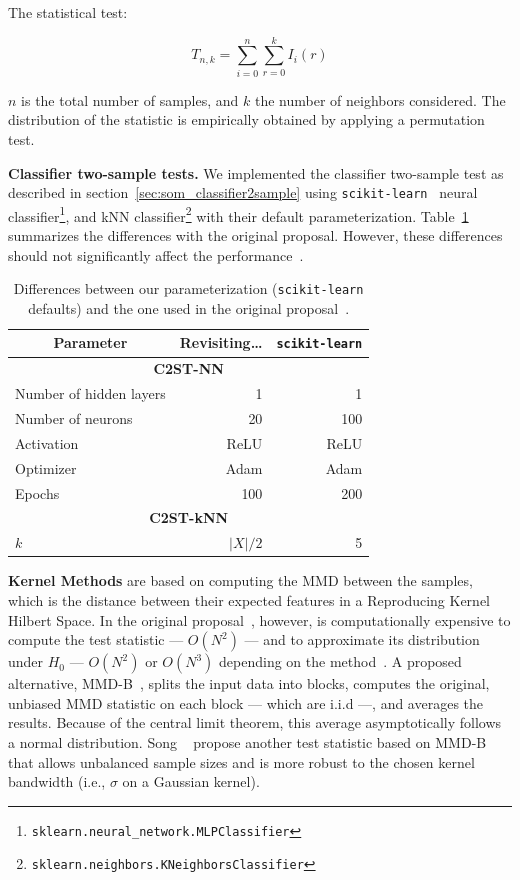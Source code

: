 The statistical test:

\begin{equation}
    T_{n,k} = \sum_{i=0}^{n}\sum_{r=0}^{k} I_i(r)
\end{equation}

$n$ is the total number of samples, and $k$ the number of neighbors considered.
The distribution of the statistic is empirically obtained by applying a permutation test.
 
\textbf{Classifier two-sample tests.}
We implemented the classifier two-sample test as described in section~\ref{sec:som_classifier2sample}
using \texttt{scikit-learn}~\cite{scikit-learn} neural
classifier\footnote{\texttt{sklearn.neural\_network.MLPClassifier}},
and \gls{kNN} classifier\footnote{\texttt{sklearn.neighbors.KNeighborsClassifier}}
with their default parameterization. Table~\ref{tab:classifier_diff} summarizes the differences with the original proposal. However, these differences should not significantly affect the performance~\cite{lopez2016revisiting}.

\begin{table}[htpb]
\centering
\begin{tabular}{lrr}
\multicolumn{1}{c}{\bfseries Parameter}       & \bfseries Revisiting\ldots & \texttt{scikit-learn}     \\ \hline
\multicolumn{3}{c}{\bfseries C2ST-NN} \\
Number of hidden layers &  1     &   1    \\
Number of neurons       & 20     & 100    \\
Activation              & ReLU   & ReLU   \\
Optimizer               & Adam   & Adam   \\
Epochs                  & 100    & 200    \\
\multicolumn{3}{c}{\bfseries C2ST-kNN} \\
$k$                     & $|X|/2$ & 5 \\
\end{tabular}
\caption[Differences between our parameterization]{
    Differences between our parameterization (\texttt{scikit-learn} defaults) and the one
    used in the original proposal~\cite{lopez2016revisiting}.
}
\label{tab:classifier_diff}
\end{table}

\textbf{Kernel Methods} are based on computing the \gls{MMD} between the samples,
which is the distance between their expected features in a Reproducing Kernel Hilbert Space.
In the original proposal~\cite{gretton2012kernel}, however, is computationally
expensive to compute the test statistic --- $O(N^2)$ --- and to approximate its distribution under
$H_0$ --- $O(N^2)$ or $O(N^3)$ depending on the method~\cite{zaremba2013b}.
A proposed alternative, MMD-B~\cite{zaremba2013b}, splits the input data into blocks, computes the original,
unbiased \gls{MMD} statistic on each block --- which are i.i.d ---, and averages the results.
Because of the central limit theorem, this average asymptotically follows a normal distribution.
Song \etal~\cite{song2021fast} propose another test statistic based on MMD-B that allows
unbalanced sample sizes and is more robust to the chosen kernel bandwidth (i.e., $\sigma$ on a Gaussian kernel).

